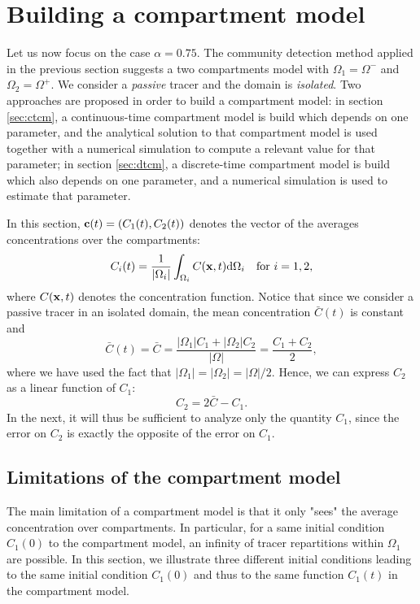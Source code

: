 \section{Building a compartment model}
Let us now focus on the case $\alpha = 0.75$. The community detection method applied in the previous section suggests a two compartments model with $\Omega_1 = \Omega^-$ and $\Omega_2 = \Omega^+$. We consider a \textit{passive} tracer and the domain is \textit{isolated}. Two approaches are proposed in order to build a compartment model: in section \ref{sec:ctcm}, a continuous-time compartment model is build which depends on one parameter, and the analytical solution to that compartment model is used together with a numerical simulation to compute a relevant value for that parameter; in section \ref{sec:dtcm}, a discrete-time compartment model is build which also depends on one parameter, and a numerical simulation is used to estimate that parameter.  

In this section, $\mathbf c(t) = (C_1(t),C_2(t))$ denotes the vector of the averages concentrations over the compartments:
\begin{equation}
	C_i(t) = \frac{1}{|\Omega_i|} \int_{\Omega_i} C(\mathbf x,t) \mathrm d\Omega_i \quad \mbox{for } i = 1,2,
\end{equation}
where $C(\mathbf x,t)$ denotes the concentration function. Notice that since we consider a passive tracer in an isolated domain, the mean concentration $\bar C(t)$ is constant and
\begin{equation}
	\bar C(t) = \bar C = \frac{|\Omega_1| C_1 + |\Omega_2| C_2}{|\Omega|} = \frac{C_1 + C_2}{2},
\end{equation}
where we have used the fact that $|\Omega_1| = |\Omega_2| = |\Omega|/2$. Hence, we can express $C_2$ as a linear function of $C_1$:
\begin{equation} \label{eq:C2-C1}
	C_2 = 2\bar C - C_1.
\end{equation}
In the next, it will thus be sufficient to analyze only the quantity $C_1$, since the error on $C_2$ is exactly the opposite of the error on $C_1$.


\subsection{Limitations of the compartment model}
The main limitation of a compartment model is that it only "sees" the average concentration over compartments. In particular, for a same initial condition $C_1(0)$ to the compartment model, an infinity of tracer repartitions within $\Omega_1$ are possible. In this section, we illustrate three different initial conditions leading to the same initial condition $C_1(0)$ and thus to the same function $C_1(t)$ in the compartment model.

